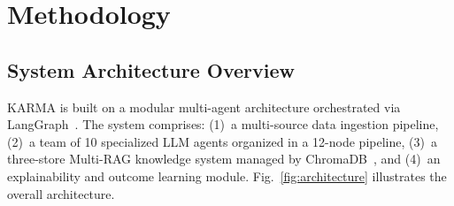 \documentclass[conference]{IEEEtran}
\begin{document}
\section{Methodology}

\subsection{System Architecture Overview}

KARMA is built on a modular multi-agent architecture orchestrated via LangGraph~\cite{langgraph2025}. The system comprises: (1)~a multi-source data ingestion pipeline, (2)~a team of 10 specialized LLM agents organized in a 12-node pipeline, (3)~a three-store Multi-RAG knowledge system managed by ChromaDB~\cite{chromadb2025}, and (4)~an explainability and outcome learning module. Fig.~\ref{fig:architecture} illustrates the overall architecture.
\end{document}
